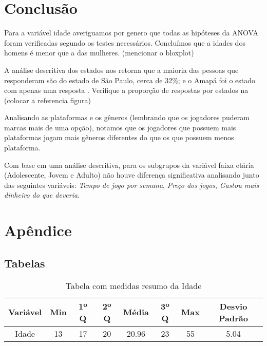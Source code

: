 \documentclass[11pt,a4paper]{article}
\begin{document}
\section{Conclusão}
\indent
Para a variável idade averiguamos por genero que todas as hipóteses da ANOVA foram verificadas segundo os testes necessários. Concluímos que a idades dos homens é menor que a das mulheres. (mencionar o bloxplot)

A análise descritiva dos estados nos retorna que a maioria das pessoas que responderam são do estado de São Paulo, cerca de 32\%; e o Amapá foi o estado com apenas uma resposta . Verifique a proporção de respostas por estados na (colocar a referencia figura)

Analisando as plataformas e os gêneros (lembrando que os jogadores puderam marcas mais de uma opção), notamos que os jogadores que possuem mais plataformas jogam mais gêneros diferentes do que os que possuem menos plataforma.


Com base em uma análise descritiva, para os subgrupos da variável faixa etária (Adolescente, Jovem e Adulto) não houve diferença significativa analisando junto das seguintes variáveis: \textit{Tempo de jogo por semana}, \textit{Preço dos jogos}, \textit{Gastou mais dinheiro do que deveria}.







\section{Apêndice}
\subsection{Tabelas}

\begin{table}[h!]
  \begin{center}
    \begin{tabular}{c|c|c|c|c|c|c|c}
    \hline
      \textbf{Variável} & \textbf{Min} &  \textbf{1º Q} &\textbf{2º Q} &  \textbf{Média}  & \textbf{3º Q} & \textbf{Max}  & \textbf{Desvio Padrão} \\
      \hline
      Idade & 13 & 17 & 20 & 20.96 & 23 & 55 & 5.04\\
      \hline
    \end{tabular}
    \caption{Tabela com medidas resumo da Idade}
     \label{table:1}
  \end{center}
\end{table}
\end{document}
